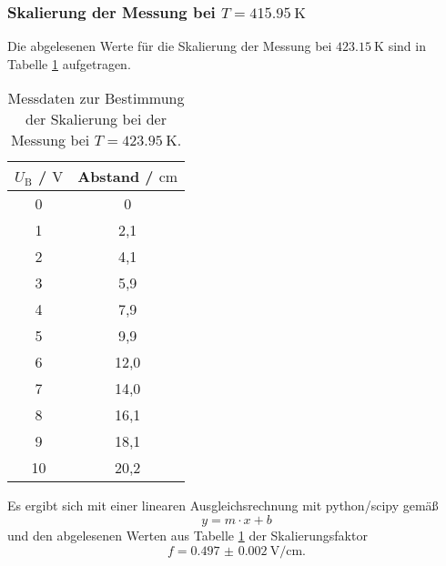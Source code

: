 \subsubsection{Skalierung der Messung bei $T=\SI{415.95}{\kelvin}$}%
Die abgelesenen Werte für die Skalierung der Messung bei $\SI{423.15}{\kelvin}$ sind in
Tabelle \ref{tab:skalierung_a_2} aufgetragen.
\begin{table}
	\centering
	\caption{Messdaten zur Bestimmung der Skalierung bei der Messung bei $T=\SI{423.95}{\kelvin}$.}
	\label{tab:skalierung_a_2}
	\begin{tabular}{cc}
		\toprule
		$U_{\mathrm{B}}$ / $\si{\volt}$ & Abstand / $\si{\centi\meter}$ \\
		\midrule
		0 & 0 \\
		1 & 2,1 \\
		2 & 4,1 \\
		3 & 5,9 \\
		4 & 7,9 \\
		5 & 9,9 \\
		6 & 12,0 \\
		7 & 14,0 \\
		8 & 16,1 \\
		9 & 18,1 \\
		10 & 20,2 \\
		\bottomrule
	\end{tabular}
\end{table}
Es ergibt sich mit einer linearen Ausgleichsrechnung mit python/scipy \cite{scipy} gemäß
\begin{equation*}
	y = m \cdot x + b
\end{equation*}
 und den abgelesenen Werten aus Tabelle \ref{tab:skalierung_a_2} der Skalierungsfaktor
\begin{equation*}
	f = \SI{0.497(2)}{\volt\per\centi\meter} \mathrm{.}
\end{equation*}
\FloatBarrier
